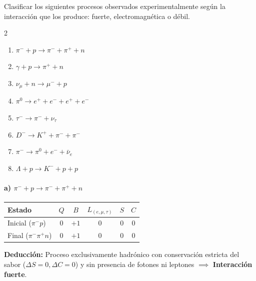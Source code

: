 \begin{problema}
Clasificar los siguientes procesos observados experimentalmente según la interacción que los produce: fuerte, electromagnética o débil.

\begin{multicols}{2}
\begin{enumerate}[label=\alph*)]
    \item $\pi^- + p \rightarrow \pi^- + \pi^+ + n$
    \item $\gamma + p \rightarrow \pi^+ + n$
    \item $\nu_\mu + n \rightarrow \mu^- + p$
    \item $\pi^0 \rightarrow e^+ + e^- + e^+ + e^-$
    \item $\tau^- \rightarrow \pi^- + \nu_\tau$
    \item $D^- \rightarrow K^+ + \pi^- + \pi^-$
    \item $\pi^- \rightarrow \pi^0 + e^- + \bar{\nu}_e$
    \item $\Lambda + p \rightarrow K^- + p + p$
\end{enumerate}
\end{multicols}

\tcblower

\paragraph{a) $\pi^- + p \rightarrow \pi^- + \pi^+ + n$}
\begin{center}
\small
\begin{tabular}{lccccc}
\toprule
\textbf{Estado} & $Q$ & $B$ & $L_{(e,\mu,\tau)}$ & $S$ & $C$ \\
\midrule
Inicial ($\pi^- p$) & $0$ & $+1$ & $0$ & $0$ & $0$ \\
Final ($\pi^- \pi^+ n$) & $0$ & $+1$ & $0$ & $0$ & $0$ \\
\bottomrule
\end{tabular}
\end{center}
\textbf{Deducción:} Proceso exclusivamente hadrónico con conservación estricta del sabor ($\Delta S = 0, \Delta C = 0$) y sin presencia de fotones ni leptones $\implies$ \textbf{Interacción fuerte}.


\end{problema}
